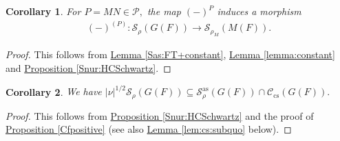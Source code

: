 \documentclass[10pt]{amsart}
\newtheorem{corollary}{Corollary}[theorem]
\theoremstyle{definition}
\numberwithin{equation}{section}
\numberwithin{equation}{subsection}
\begin{document}
\begin{corollary}
    For $P=MN\in \mathcal{P},$ the map $(-)^P$ induces a morphism
\begin{align*}
    (-)^{(P)}:\mathcal{S}_\rho(G(F))\longrightarrow\mathcal{S}_{\rho_M}(M(F)).
\end{align*}
\end{corollary}

\begin{proof}
    This follows from \hyperref[Sas:FT+constant]{Lemma \ref{Sas:FT+constant}}, \hyperref[lemma:constant]{Lemma \ref{lemma:constant}} and \hyperref[Snur:HCSchwartz]{Proposition \ref{Snur:HCSchwartz}}.
\end{proof}

\begin{corollary}\label{Sinfty:comp}
    We have $|\nu|^{1/2}\mathcal{S}_\rho(G(F))\subseteq \mathcal{S}_\rho^{\mathrm{as}}(G(F))\cap \mathcal{C}_{\mathrm{cs}}(G(F)).$
\end{corollary}
\begin{proof}
    This follows from  \hyperref[Snur:HCSchwartz]{Proposition \ref{Snur:HCSchwartz}} and the proof of \hyperref[Cfpositive]{Proposition \ref{Cfpositive}} (see also \hyperref[lem:cs:subquo]{Lemma \ref{lem:cs:subquo}} below).
\end{proof}
\end{document}
